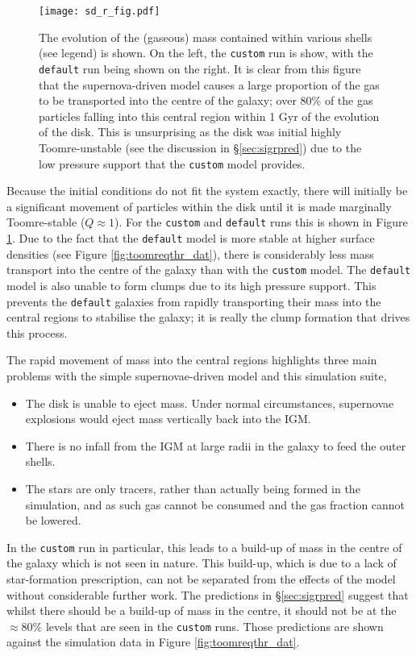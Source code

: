 \begin{figure}[!ht]
    \centering
    \texttt{[image: sd\_r\_fig.pdf]}
    \caption{The evolution of the (gaseous) mass contained within various shells (see legend) is shown. On the left, the {\tt custom} run is show, with the {\tt default} run being shown on the right. It is clear from this figure that the supernova-driven model causes a large proportion of the gas to be transported into the centre of the galaxy; over 80\% of the gas particles falling into this central region within 1 Gyr of the evolution of the disk. This is unsurprising as the disk was initial highly Toomre-unstable (see the discussion in \S \ref{sec:sigrpred}) due to the low pressure support that the {\tt custom} model provides.}
    \label{fig:sd_r_evo}
\end{figure}
Because the initial conditions do not fit the system exactly, there will initially be a significant movement of particles within the disk until it is made marginally Toomre-stable ($Q\approx1$).
For the {\tt custom} and {\tt default} runs this is shown in Figure \ref{fig:sd_r_evo}.
Due to the fact that the {\tt default} model is more stable at higher surface densities (see Figure \ref{fig:toomreqthr_dat}), there is considerably less mass transport into the centre of the galaxy than with the {\tt custom} model.
The {\tt default} model is also unable to form clumps due to its high pressure support.
This prevents the {\tt default} galaxies from rapidly transporting their mass into the central regions to stabilise the galaxy; it is really the clump formation that drives this process. 

The rapid movement of mass into the central regions highlights three main problems with the simple supernovae-driven model and this simulation suite,
\begin{itemize}
    \item The disk is unable to eject mass. Under normal circumstances, supernovae explosions would eject mass vertically back into the IGM.
    \item There is no infall from the IGM at large radii in the galaxy to feed the outer shells.
    \item The stars are only tracers, rather than actually being formed in the simulation, and as such gas cannot be consumed and the gas fraction cannot be lowered.
\end{itemize}
In the {\tt custom} run in particular, this leads to a build-up of mass in the centre of the galaxy which is not seen in nature.
This build-up, which is due to a lack of star-formation prescription, can not be separated from the effects of the model without considerable further work.
The predictions in \S \ref{sec:sigrpred} suggest that whilst there should be a build-up of mass in the centre, it should not be at the $\approx 80\%$ levels that are seen in the {\tt custom} runs.
Those predictions are shown against the simulation data in Figure \ref{fig:toomreqthr_dat}.

